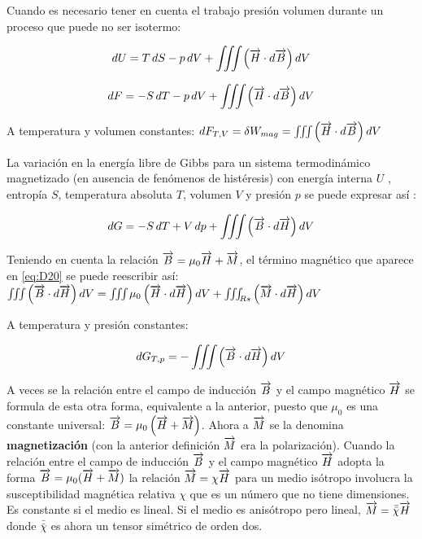 Cuando es necesario tener en cuenta el trabajo presión volumen durante un proceso que puede no ser isotermo:

\begin{equation}
	\label{eq:D18}
	 dU= T\,dS-p\,dV+ \iiint \left( \overrightarrow{H} \cdot d\overrightarrow{B} \right) dV
\end{equation}

\begin{equation}
	\label{eq:D19}
	 dF= -S\,dT-p\,dV+ \iiint \left( \overrightarrow{H} \cdot d\overrightarrow{B} \right) dV
\end{equation}

A temperatura y volumen constantes: ${dF_{T,V}= \delta W_{mag}= \iiint \left( \overrightarrow{H} \cdot d\overrightarrow{B} \right) dV }$

La variación en la energía libre de Gibbs para un sistema termodinámico magnetizado (en ausencia de fenómenos de histéresis) con energía interna $U$ , entropía $S$, temperatura absoluta $T$, volumen $V$ y presión $p$ se puede expresar así \citep{Guggenheim1}:

\begin{equation}
	\label{eq:D20}
	 dG= -S\,dT + V\,dp+ \iiint \left( \overrightarrow{B} \cdot d\overrightarrow{H} \right) dV
\end{equation}

\begin{sloppypar}
Teniendo en cuenta la relación  ${\overrightarrow{B}= \mu_{0}\overrightarrow{H}+\overrightarrow{M}}$, el término magnético que aparece en \ref{eq:D20} se puede reescribir así: ${ \iiint \left( \overrightarrow{B} \cdot d\overrightarrow{H} \right) dV =  \iiint \mu_{0}\left( \overrightarrow{H} \cdot d\overrightarrow{H} \right) dV + \iiint_{Rs} \left( \overrightarrow{M} \cdot d\overrightarrow{H} \right) dV}$
\end{sloppypar}
A temperatura y presión constantes:

\begin{equation}
	\label{eq:D21}
	dG_{T, p} = - \iiint \left( \overrightarrow{B} \cdot d\overrightarrow{H} \right) dV 
\end{equation}

\begin{sloppypar}
A veces se la relación entre el campo de inducción $\overrightarrow{B}$ y el campo magnético $\overrightarrow{H}$ se formula de esta otra forma, equivalente a la anterior, puesto que $\mu_{0}$ es una constante universal: ${\overrightarrow{B} = \mu_{0}\left( \overrightarrow{H}+\overrightarrow{M} \right)}$. Ahora a $\overrightarrow{M}$ se la denomina \textbf{magnetización} (con la anterior definición $\overrightarrow{M}$ era la polarización). Cuando la relación entre el campo de inducción $\overrightarrow{B}$ y el campo magnético $\overrightarrow{H}$ adopta la forma $\overrightarrow{B} =\mu_{0}( \overrightarrow{H} +\overrightarrow{M})$ la relación $\overrightarrow{M}=\chi\overrightarrow{H}$ para un medio isótropo involucra la susceptibilidad magnética relativa $\chi$ que es un número que no tiene dimensiones. Es constante si el medio es lineal. Si el medio es anisótropo pero lineal, ${\overrightarrow{M}=\bar{\bar{\chi}}\overrightarrow{H}}$ donde $\bar{\bar{\chi}}$ es ahora un tensor simétrico de orden dos.
\end{sloppypar}

